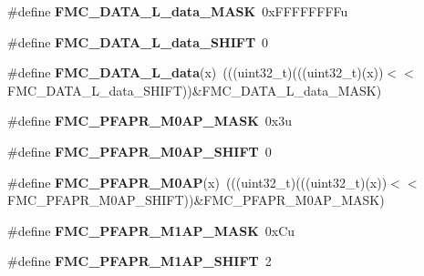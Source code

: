 \begin{DoxyCompactItemize}
\item 
\#define {\bfseries F\+M\+C\+\_\+\+D\+A\+T\+A\+\_\+\+L\+\_\+data\+\_\+\+M\+A\+SK}~0x\+F\+F\+F\+F\+F\+F\+F\+Fu\hypertarget{group__FMC__Register__Masks_gaefcb45152ed3dc9c4ac7b353f4eab44b}{}\label{group__FMC__Register__Masks_gaefcb45152ed3dc9c4ac7b353f4eab44b}

\item 
\#define {\bfseries F\+M\+C\+\_\+\+D\+A\+T\+A\+\_\+\+L\+\_\+data\+\_\+\+S\+H\+I\+FT}~0\hypertarget{group__FMC__Register__Masks_gabef8366f6d036877a0600a2594f08bfb}{}\label{group__FMC__Register__Masks_gabef8366f6d036877a0600a2594f08bfb}

\item 
\#define {\bfseries F\+M\+C\+\_\+\+D\+A\+T\+A\+\_\+\+L\+\_\+data}(x)~(((uint32\+\_\+t)(((uint32\+\_\+t)(x))$<$$<$F\+M\+C\+\_\+\+D\+A\+T\+A\+\_\+\+L\+\_\+data\+\_\+\+S\+H\+I\+FT))\&F\+M\+C\+\_\+\+D\+A\+T\+A\+\_\+\+L\+\_\+data\+\_\+\+M\+A\+SK)\hypertarget{group__FMC__Register__Masks_ga10e9daea84fd57e92170db3aedf7610a}{}\label{group__FMC__Register__Masks_ga10e9daea84fd57e92170db3aedf7610a}

\item 
\#define {\bfseries F\+M\+C\+\_\+\+P\+F\+A\+P\+R\+\_\+\+M0\+A\+P\+\_\+\+M\+A\+SK}~0x3u\hypertarget{group__FMC__Register__Masks_gac1ee4a2aca52fe6f68d05ce0b43dd6b8}{}\label{group__FMC__Register__Masks_gac1ee4a2aca52fe6f68d05ce0b43dd6b8}

\item 
\#define {\bfseries F\+M\+C\+\_\+\+P\+F\+A\+P\+R\+\_\+\+M0\+A\+P\+\_\+\+S\+H\+I\+FT}~0\hypertarget{group__FMC__Register__Masks_gaff9b97ca7b6e58fe7aa92c088e2f2fe1}{}\label{group__FMC__Register__Masks_gaff9b97ca7b6e58fe7aa92c088e2f2fe1}

\item 
\#define {\bfseries F\+M\+C\+\_\+\+P\+F\+A\+P\+R\+\_\+\+M0\+AP}(x)~(((uint32\+\_\+t)(((uint32\+\_\+t)(x))$<$$<$F\+M\+C\+\_\+\+P\+F\+A\+P\+R\+\_\+\+M0\+A\+P\+\_\+\+S\+H\+I\+FT))\&F\+M\+C\+\_\+\+P\+F\+A\+P\+R\+\_\+\+M0\+A\+P\+\_\+\+M\+A\+SK)\hypertarget{group__FMC__Register__Masks_gab97b8b95ec08fb228b89f8d69109e233}{}\label{group__FMC__Register__Masks_gab97b8b95ec08fb228b89f8d69109e233}

\item 
\#define {\bfseries F\+M\+C\+\_\+\+P\+F\+A\+P\+R\+\_\+\+M1\+A\+P\+\_\+\+M\+A\+SK}~0x\+Cu\hypertarget{group__FMC__Register__Masks_ga8b0888db1811509a1b7581445a8a1573}{}\label{group__FMC__Register__Masks_ga8b0888db1811509a1b7581445a8a1573}

\item 
\#define {\bfseries F\+M\+C\+\_\+\+P\+F\+A\+P\+R\+\_\+\+M1\+A\+P\+\_\+\+S\+H\+I\+FT}~2\hypertarget{group__FMC__Register__Masks_gac50a9d09140ddfce2457e804b44d2ce5}{}\label{group__FMC__Register__Masks_gac50a9d09140ddfce2457e804b44d2ce5}


\end{DoxyCompactItemize}
